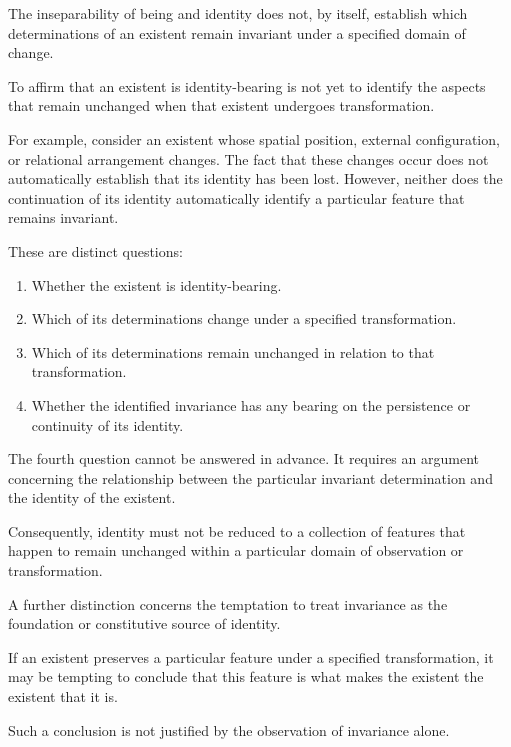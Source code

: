 The inseparability of being and identity does not,
by itself, establish which determinations of an
existent remain invariant under a specified domain
of change.

To affirm that an existent is identity-bearing is
not yet to identify the aspects that remain unchanged
when that existent undergoes transformation.

For example, consider an existent whose spatial
position, external configuration, or relational
arrangement changes. The fact that these changes
occur does not automatically establish that its
identity has been lost. However, neither does the
continuation of its identity automatically identify
a particular feature that remains invariant.

These are distinct questions:

\begin{enumerate}
    \item Whether the existent is identity-bearing.
    \item Which of its determinations change under
    a specified transformation.
    \item Which of its determinations remain unchanged
    in relation to that transformation.
    \item Whether the identified invariance has any
    bearing on the persistence or continuity of its identity.
\end{enumerate}

The fourth question cannot be answered in advance.
It requires an argument concerning the relationship
between the particular invariant determination and
the identity of the existent.

Consequently, identity must not be reduced to a
collection of features that happen to remain unchanged
within a particular domain of observation or transformation.


A further distinction concerns the temptation to
treat invariance as the foundation or constitutive
source of identity.

If an existent preserves a particular feature under
a specified transformation, it may be tempting to
conclude that this feature is what makes the existent
the existent that it is.

Such a conclusion is not justified by the observation
of invariance alone.

